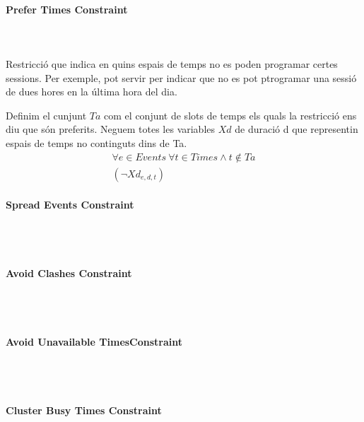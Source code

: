 \documentclass[11pt,a4paper,twoside]{report}
\begin{document}
  \paragraph*{Prefer Times Constraint} ~\\~\\
  Restricció que indica en quins espais de temps no es poden programar certes sessions. Per exemple, pot servir per indicar que no es pot ptrogramar una sessió de dues hores en la última hora del dia.

  Definim el cunjunt $Ta$ com el conjunt de slots de temps els quals la restricció ens diu que són preferits. Neguem totes les variables $Xd$ de duració d que representin espais de temps no continguts dins de Ta.
  \begin{gather*}
    \forall e \in Events \ \forall t \in Times \land t \notin Ta \\ (\neg Xd_{e,d,t})
  \end{gather*}


  \paragraph*{Spread Events Constraint} ~\\~\\

  

  \paragraph*{Avoid Clashes Constraint} ~\\~\\
  \paragraph*{Avoid Unavailable TimesConstraint} ~\\~\\
  \paragraph*{Cluster Busy Times Constraint} ~\\~\\
  


   
  
    
\end{document}

